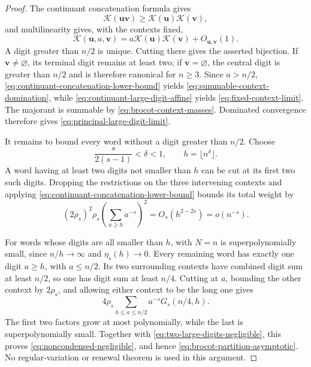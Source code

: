 \begin{proof}
The continuant concatenation formula gives
\begin{equation}
 \mathcal K(\mathbf u\mathbf v)
 \ge\mathcal K(\mathbf u)\mathcal K(\mathbf v),
 \label{eq:continuant-concatenation-lower-bound}
\end{equation}
and multilinearity gives, with the contexts fixed,
\begin{equation}
 \mathcal K(\mathbf u,a,\mathbf v)
 =a\mathcal K(\mathbf u)\mathcal K(\mathbf v)
  +O_{\mathbf u,\mathbf v}(1).
 \label{eq:continuant-large-digit-affine}
\end{equation}
A digit greater than \(n/2\) is unique.  Cutting there gives the asserted
bijection.  If \(\mathbf v\ne\varnothing\), its terminal digit remains at
least two; if \(\mathbf v=\varnothing\), the central digit is greater than
\(n/2\) and is therefore canonical for \(n\ge3\).  Since \(a>n/2\),
\eqref{eq:continuant-concatenation-lower-bound} yields
\eqref{eq:summable-context-domination}, while
\eqref{eq:continuant-large-digit-affine} yields
\eqref{eq:fixed-context-limit}.  The majorant is summable by
\eqref{eq:brocot-context-masses}.  Dominated convergence therefore gives
\eqref{eq:principal-large-digit-limit}.

It remains to bound every word without a digit greater than \(n/2\).  Choose
\[
 \frac{s}{2(s-1)}<\delta<1,
 \qquad h=\lfloor n^\delta\rfloor.
\]
A word having at least two digits not smaller than \(h\) can be cut at its
first two such digits.  Dropping the restrictions on the three intervening
contexts and applying \eqref{eq:continuant-concatenation-lower-bound} bounds
its total weight by
\begin{equation}
 (2\rho_s)^2\rho_s
 \left(\sum_{a\ge h}a^{-s}\right)^2
 =O_s(h^{2-2s})=o(n^{-s}).
 \label{eq:two-large-digits-negligible}
\end{equation}

For words whose digits are all smaller than \(h\),
 with \(N=n\) is
superpolynomially small, since \(n/h\to\infty\) and \(\eta_s(h)\to0\).
Every remaining word has exactly one digit \(a\ge h\), with \(a\le n/2\).
Its two surrounding contexts have combined digit sum at least \(n/2\), so
one has digit sum at least \(n/4\).  Cutting at \(a\), bounding the other
context by \(2\rho_s\), and allowing either context to be the long one gives
\[
 4\rho_s\sum_{h\le a\le n/2}a^{-s}G_s(n/4,h).
\]
The first two factors grow at most polynomially, while the last is
superpolynomially small.  Together with
\eqref{eq:two-large-digits-negligible}, this proves
\eqref{eq:noncondensed-negligible}, and hence
\eqref{eq:brocot-partition-asymptotic}.  No regular-variation or renewal
theorem is used in this argument.
\end{proof}

